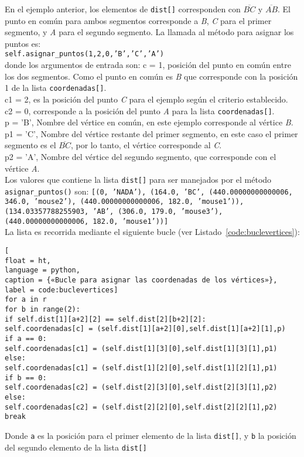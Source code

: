 En el ejemplo anterior, los elementos de \texttt{dist[]} corresponden con $\overline{BC}$ y $\overline{AB}$. El punto en común para ambos segmentos corresponde a \textit{\textit{B}}, \textit{C} para el primer segmento, y \textit{A} para el segundo segmento.
La llamada al método para asignar los puntos es:\\
\texttt{self.asignar\_puntos(1,2,0,'B','C','A')}\\
donde los argumentos de entrada son:
c = 1, posición del punto en común entre los dos segmentos. Como el punto en común es \textit{B} que corresponde con la posición 1 de la lista \texttt{coordenadas[]}.\\
c1 = 2, es la posición del punto \textit{C} para el ejemplo según el criterio establecido.\\
c2 = 0, corresponde a la posición del punto \textit{A} para la lista \texttt{coordenadas[]}.\\
p = 'B', Nombre del vértice en común, en este ejemplo corresponde al vértice \textit{B}.\\
p1 = 'C', Nombre del vértice restante del primer segmento, en este caso el primer segmento es el $\overline{BC}$, por lo tanto, el vértice corresponde al \textit{C}.\\
p2 = 'A', Nombre del vértice del segundo segmento, que corresponde con el vértice \textit{A}.\\

Los valores que contiene la lista \texttt{dist[]} para ser manejados por el método \texttt{asignar\_puntos()} son:
\texttt{[(0, 'NADA'), (164.0, 'BC', (440.00000000000006, 346.0, 'mouse2'), (440.00000000000006, 182.0, 'mouse1')), (134.03357788255903, 'AB', (306.0, 179.0, 'mouse3'), (440.00000000000006, 182.0, 'mouse1'))]}\\

La lista es recorrida mediante el siguiente bucle (ver Listado~\ref{code:buclevertices}):
\begin{lstlisting}[
float = ht, 
language = python,
caption = {«Bucle para asignar las coordenadas de los vértices»},
label = code:buclevertices]
for a in r
for b in range(2):
if self.dist[1][a+2][2] == self.dist[2][b+2][2]:
self.coordenadas[c] = (self.dist[1][a+2][0],self.dist[1][a+2][1],p)
if a == 0:
self.coordenadas[c1] = (self.dist[1][3][0],self.dist[1][3][1],p1)
else:
self.coordenadas[c1] = (self.dist[1][2][0],self.dist[1][2][1],p1)
if b == 0:
self.coordenadas[c2] = (self.dist[2][3][0],self.dist[2][3][1],p2)
else:
self.coordenadas[c2] = (self.dist[2][2][0],self.dist[2][2][1],p2)
break
\end{lstlisting}
Donde \texttt{a} es la posición para el primer elemento de la lista \texttt{dist[]}, y \texttt{b} la posición del segundo elemento de la lista \texttt{dist[]}

